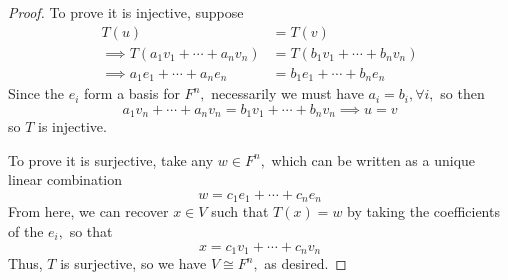 \documentclass{article}
\begin{document}
\begin{itemize}
\begin{proof}
			To prove it is injective, suppose
			\begin{align*}
				T(u) &= T(v) \\
				\implies T(a_1v_1 + \cdots +a_nv_n) &= T(b_1v_1 + \cdots + b_nv_n) \\
				\implies a_1e_1 + \cdots + a_ne_n &= b_1e_1 + \cdots + b_ne_n
			\end{align*}
			Since the $e_i$ form a basis for $F^n,$ necessarily we must have $a_i=b_i, \forall i,$ so then
			\[a_1v_n + \cdots + a_nv_n = b_1v_1 + \cdots + b_nv_n\implies u=v\]
			so $T$ is injective.

			To prove it is surjective, take any $w\in F^n,$ which can be written as a unique linear combination
			\[w = c_1e_1+\cdots+c_ne_n\]
			From here, we can recover $x\in V$ such that $T(x)=w$ by taking the coefficients of the $e_i,$ so that
			\[x=c_1v_1+\cdots+c_nv_n\]
			Thus, $T$ is surjective, so we have $V\cong F^n,$ as desired.
		\end{proof}
		
\end{itemize}
\end{document}
